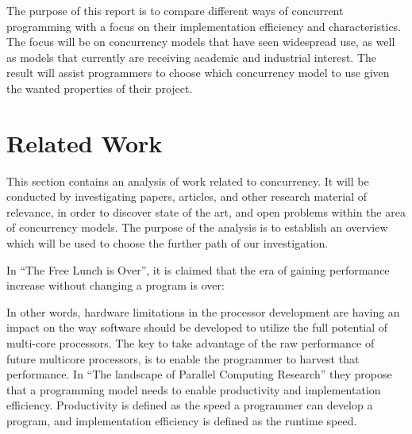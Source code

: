 The purpose of this report is to compare different ways of concurrent programming with a focus on their implementation efficiency and characteristics. The focus will be on concurrency models that have seen widespread use, as well as models that currently are receiving academic and industrial interest. The result will assist programmers to choose which concurrency model to use given the wanted properties of their project.

\section{Related Work}\label{sec:relatedwork}
This section contains an analysis of work related to concurrency. It will be conducted by investigating papers, articles, and other research material of relevance, in order to discover state of the art, and open problems within the area of concurrency models. The purpose of the analysis is to establish an overview which will be used to choose the further path of our investigation.

In ``The Free Lunch is Over''\cite{sutter2005free}, it is claimed that the era of gaining performance increase without changing a program is over:


In other words, hardware limitations in the processor development are having an impact on the way software should be developed to utilize the full potential of multi-core processors. The key to take advantage of the raw performance of future multicore processors, is to enable the programmer to harvest that performance\cite[p. 31]{asanovic2006landscape}. In ``The landscape of Parallel Computing Research''\cite{asanovic2006landscape} they propose that a programming model needs to enable productivity and implementation efficiency\cite[p. 31]{asanovic2006landscape}. Productivity is defined as the speed a programmer can develop a program, and implementation efficiency is defined as the runtime speed.

